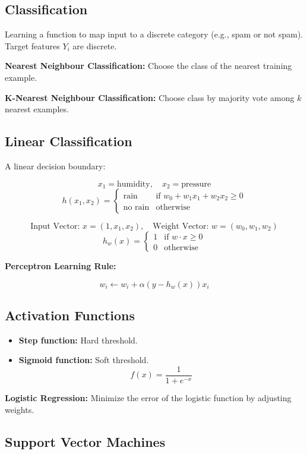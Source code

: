 \subsection{Classification}

Learning a function to map input to a discrete category (e.g., spam or not spam). Target features $Y_i$ are discrete.

\textbf{Nearest Neighbour Classification:} Choose the class of the nearest training example.

\textbf{K-Nearest Neighbour Classification:} Choose class by majority vote among $k$ nearest examples.

\subsection{Linear Classification}

A linear decision boundary:

\[
x_1 = \text{humidity},\quad x_2 = \text{pressure}
\]
\[
h(x_1, x_2) =
\begin{cases}
\text{rain} & \text{if } w_0 + w_1x_1 + w_2x_2 \geq 0 \\
\text{no rain} & \text{otherwise}
\end{cases}
\]

\[
\text{Input Vector: } x = (1, x_1, x_2),\quad \text{Weight Vector: } w = (w_0, w_1, w_2)
\]
\[
h_w(x) =
\begin{cases}
1 & \text{if } w \cdot x \geq 0 \\
0 & \text{otherwise}
\end{cases}
\]

\textbf{Perceptron Learning Rule:}

\[
w_i \leftarrow w_i + \alpha (y - h_w(x)) x_i
\]

\subsection{Activation Functions}

\begin{itemize}
    \item \textbf{Step function:} Hard threshold.
    \item \textbf{Sigmoid function:} Soft threshold.
    \[
    f(x) = \frac{1}{1 + e^{-x}}
    \]
\end{itemize}

\textbf{Logistic Regression:} Minimize the error of the logistic function by adjusting weights.

\subsection{Support Vector Machines}

